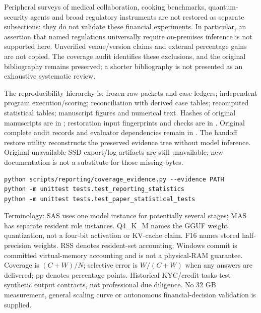Peripheral surveys of medical collaboration, cooking benchmarks, quantum-security agents and broad regulatory instruments are not restored as separate subsections: they do not validate these financial experiments. In particular, an assertion that named regulations universally require on-premises inference is not supported here. Unverified venue/version claims and external percentage gains are not copied. The coverage audit identifies these exclusions, and the original bibliography remains preserved; a shorter bibliography is not presented as an exhaustive systematic review.

The reproducibility hierarchy is: frozen raw packets and case ledgers; independent program execution/scoring; reconciliation with derived case tables; recomputed statistical tables; manuscript figures and numerical text. Hashes of original manuscripts are in ; restoration input fingerprints and checks are in . Original complete audit records and evaluator dependencies remain in . The handoff restore utility reconstructs the preserved evidence tree without model inference. Original unavailable SSD export/log artifacts are still unavailable; new documentation is not a substitute for those missing bytes.

\begin{verbatim}
python scripts/reporting/coverage_evidence.py --evidence PATH
python -m unittest tests.test_reporting_statistics
python -m unittest tests.test_paper_statistical_tests
\end{verbatim}

Terminology: SAS uses one model instance for potentially several stages; MAS has separate resident role instances. Q4\_K\_M names the GGUF weight quantization, not a four-bit activation or KV-cache claim. F16 names stored half-precision weights. RSS denotes resident-set accounting; Windows commit is committed virtual-memory accounting and is not a physical-RAM guarantee. Coverage is $(C+W)/N$; selective error is $W/(C+W)$ when any answers are delivered; pp denotes percentage points. Historical KYC/credit tasks test synthetic output contracts, not professional due diligence. No 32 GB measurement, general scaling curve or autonomous financial-decision validation is supplied.
